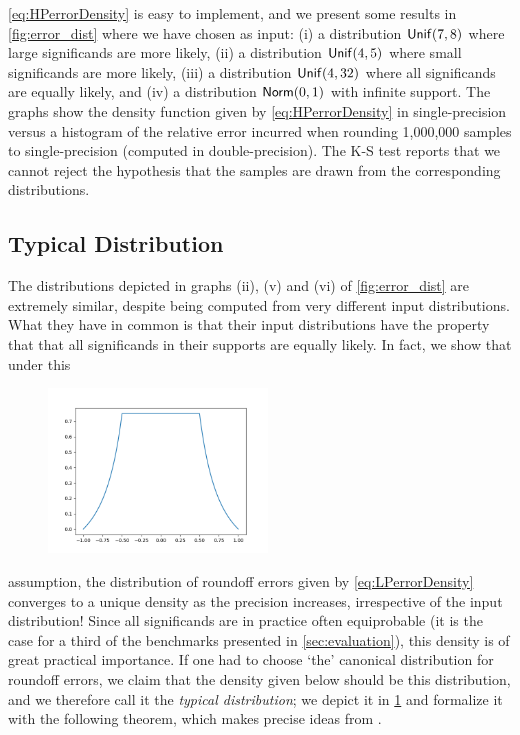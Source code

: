 \cref{eq:HPerrorDensity} is easy to implement, and we present some results in \cref{fig:error_dist} where we have chosen as input: (i) a distribution $\mathsf{Unif}(7,8)$ where large significands are more likely, (ii) a distribution $\mathsf{Unif}(4,5)$ where small significands are more likely, (iii) a distribution $\mathsf{Unif}(4,32)$ where all significands are equally likely, and (iv) a distribution $\mathsf{Norm}(0,1)$ with infinite support. The graphs show the density function given by \cref{eq:HPerrorDensity} in single-precision versus a histogram of the relative error incurred when rounding 1,000,000  samples to single-precision (computed in double-precision).  The K-S test reports that we cannot reject the hypothesis that the samples are drawn from the corresponding distributions.

\subsection{Typical Distribution}\label{subsec:typical}
The distributions depicted in graphs (ii), (v) and (vi) of \cref{fig:error_dist} are extremely similar, despite being computed from very different input distributions. What they have in common is that their input distributions have the property that that all significands in their supports are equally likely.  In fact, we show that under this 
\begin{figure}
\vspace{-7mm}
\includegraphics[width=0.52\textwidth]{pics/typical_dist.png}
\label{fig:typical}
\end{figure}
assumption,  the distribution of roundoff errors given by \cref{eq:LPerrorDensity} converges to a unique density 
as the precision increases, irrespective of the input distribution! 
Since all significands are in practice often equiprobable (it is the case for a third of the benchmarks presented in \cref{sec:evaluation}), this density is of great practical importance.  If one had to choose `the' canonical distribution for roundoff errors, we claim that the density given below should be this distribution, and we therefore call it the \emph{typical distribution}; we depict it in \cref{fig:typical} and formalize it with the following theorem, which makes precise ideas from \cite{dahlqvist2019probabilistic}.

